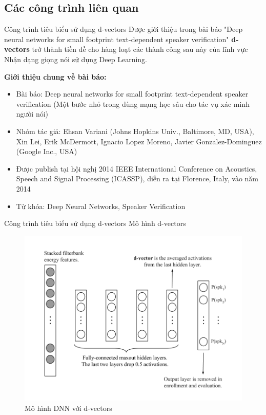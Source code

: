\documentclass[notheorems, aspectratio=54]{beamer}
\begin{document}
\subsection{Các công trình liên quan}
\begin{frame}{Công trình tiêu biểu sử dụng d-vectors}
	Được giới thiệu trong bài báo "Deep neural networks for small footprint text-dependent speaker verification" \textbf{d-vectors} trở thành tiền đề cho hàng loạt các thành công sau này của lĩnh vực Nhận dạng giọng nói sử dụng Deep Learning.
	
	\textbf{Giới thiệu chung về bài báo:}
	\begin{itemize}
		\item Bài báo: Deep neural networks for small footprint text-dependent speaker verification (Một bước nhỏ trong dùng mạng học sâu cho tác vụ xác minh người nói)
		\item Nhóm tác giả: Ehsan Variani (Johns Hopkins Univ., Baltimore, MD, USA), Xin Lei, Erik McDermott, Ignacio Lopez Moreno, Javier Gonzalez-Dominguez (Google Inc., USA)
		\item Được publish tại hội nghị 2014 IEEE International Conference on Acoustics, Speech and Signal Processing (ICASSP), diễn ra tại Florence, Italy, vào năm 2014
		\item Từ khóa: Deep Neural Networks, Speaker Verification
	\end{itemize}
\end{frame}
\begin{frame}{Công trình tiêu biểu sử dụng d-vectors}
	Mô hình d-vectors
	\begin{figure}[H]
		\includegraphics[width=0.7\linewidth]{images/d-vectors.png}
		\caption{Mô hình DNN với d-vectors}
		\label{fig:writing-thesis}
	\end{figure}
\end{frame}
\end{document}
